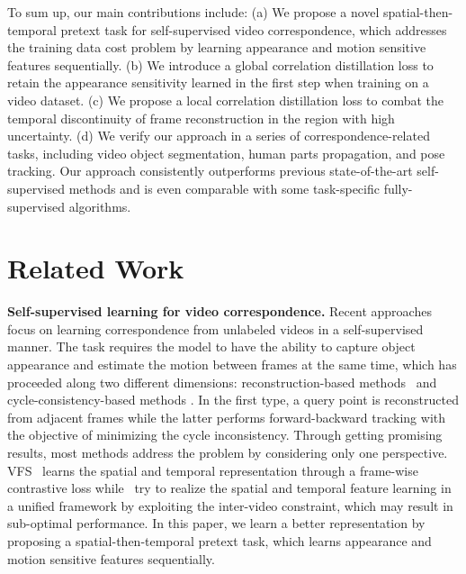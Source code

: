 \documentclass{article}
\begin{document}
To sum up, our main contributions include: (a) We propose a novel spatial-then-temporal pretext task for self-supervised video correspondence, which addresses the training data cost problem by learning appearance and motion sensitive features sequentially. (b) We introduce a global correlation distillation loss to retain the appearance sensitivity learned in the first step when training on a video dataset. (c) We propose a local correlation distillation loss to combat the temporal discontinuity of frame reconstruction in the region with high uncertainty.  (d) We verify our approach in a series of correspondence-related tasks, including video object segmentation, human parts propagation, and pose tracking. Our approach consistently outperforms previous state-of-the-art self-supervised methods and is even comparable with some task-specific fully-supervised algorithms.
\vspace{-4mm}

\section{Related Work}
\textbf{Self-supervised learning for video correspondence.} 
Recent approaches focus on learning correspondence from unlabeled videos in a self-supervised manner. The task requires the model to have the ability to capture object appearance and estimate the motion between frames at the same time, which has proceeded along two different dimensions: reconstruction-based methods~\cite{lai2019self}\cite{lai2020mast}\cite{li2019joint}\cite{vondrick2018tracking}\cite{wang2020contrastive} and cycle-consistency-based methods \cite{jabri2020space}\cite{wang2019learning}\cite{zhao2021modelling}. In the first type, a query point is reconstructed from adjacent frames while the latter performs forward-backward tracking with the objective of minimizing the cycle inconsistency. Through getting promising results, most methods address the problem by considering only one perspective. VFS~\cite{xu2021rethinking} learns the spatial and temporal representation through a frame-wise contrastive loss while~\cite{araslanov2021dense}\cite{wang2020contrastive} try to realize the spatial and temporal feature learning in a unified framework by exploiting the inter-video constraint, which may result in sub-optimal performance. In this paper, we learn a better representation by proposing a spatial-then-temporal pretext task, which learns appearance and motion sensitive features sequentially.
\end{document}
